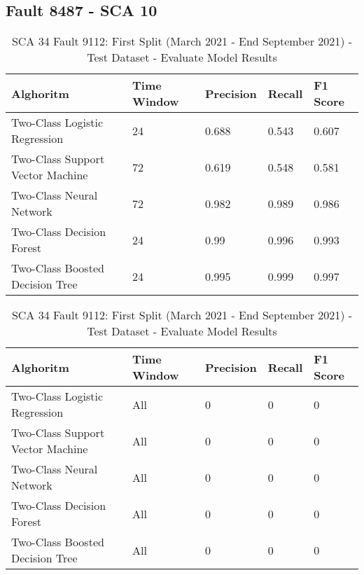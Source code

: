 \subsection{Fault 8487 - SCA 10}

\begin{table}[!ht]
    \centering
    \begin{tabular}{|l|l|l|l|l|}
    \hline
        Alghoritm & Time Window & Precision & Recall & F1 Score \\ \hline
        Two-Class Logistic Regression & 24 & 0.688 & 0.543 & 0.607 \\ \hline
        Two-Class Support Vector Machine & 72 & 0.619 & 0.548 & 0.581 \\ \hline
        Two-Class Neural Network & 72 & 0.982 & 0.989 & 0.986 \\ \hline
        Two-Class Decision Forest & 24 & 0.99 & 0.996 & 0.993 \\ \hline
        Two-Class Boosted Decision Tree & 24 & 0.995 & 0.999 & 0.997 \\ \hline
    \end{tabular}
    \caption{SCA 34 Fault 9112: First Split (March 2021 - End September 2021) - Test Dataset - Evaluate Model Results}
    \label{9112_SCA34_1st}
\end{table}

\begin{table}[!ht]
    \centering
    \begin{tabular}{|l|l|l|l|l|}
    \hline
        Alghoritm & Time Window & Precision & Recall & F1 Score \\ \hline
        Two-Class Logistic Regression & All & 0 & 0 & 0 \\ \hline
        Two-Class Support Vector Machine & All & 0 & 0 & 0 \\ \hline
        Two-Class Neural Network & All & 0 & 0 & 0 \\ \hline
        Two-Class Decision Forest & All & 0 & 0 & 0 \\ \hline
        Two-Class Boosted Decision Tree & All & 0 & 0 & 0 \\ \hline
    \end{tabular}
    \caption{SCA 34 Fault 9112: First Split (March 2021 - End September 2021) - Test Dataset - Evaluate Model Results}
    \label{9112_SCA34_1st}
\end{table}

